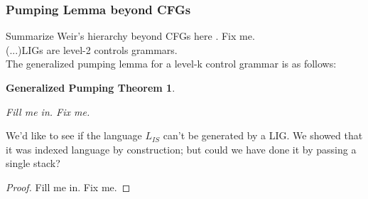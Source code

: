 \documentclass[11pt]{article}
\begin{document}
\subsubsection {Pumping Lemma beyond CFGs}
Summarize Weir's hierarchy beyond CFGs here \cite{Weir1992}.
Fix me.\\
(...)LIGs are level-2 controls grammars.\\
The generalized pumping lemma for a level-k control grammar is as follows:
\newtheorem{thm:pumping-general}{Generalized Pumping Theorem}
\begin{thm:pumping-general} \label{thm:pumping-general}
\begin{algorithmic}
Fill me in. Fix me.
\end{algorithmic}
\end{thm:pumping-general}
We'd like to see if the language $L_{IS}$ can't be generated by a LIG.
We showed that it was indexed language by construction; but could we have
done it by passing a single stack? \\
\begin{proof}
Fill me in. Fix me.
\end{proof}
\end{document}
